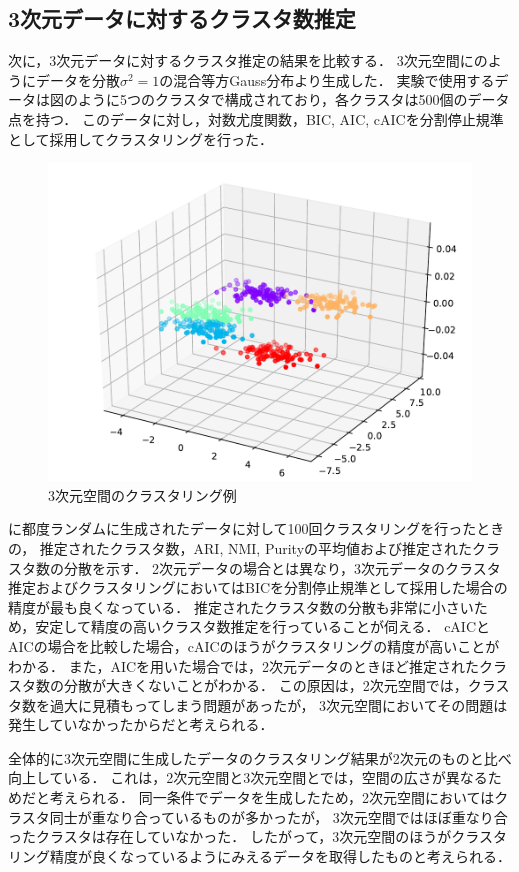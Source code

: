 \subsection{3次元データに対するクラスタ数推定}

次に，3次元データに対するクラスタ推定の結果を比較する．
3次元空間にのようにデータを分散$\sigma^2=1$の混合等方Gauss分布より生成した．
実験で使用するデータは図のように5つのクラスタで構成されており，各クラスタは500個のデータ点を持つ．
このデータに対し，対数尤度関数，BIC, AIC, cAICを分割停止規準として採用してクラスタリングを行った．

\begin{figure}[htbp]
  \begin{center}
    \includegraphics[width=0.7\linewidth]{./img/BIC_3.pdf}
      \caption{3次元空間のクラスタリング例}
      \label{fig:3dim}
  \end{center}
\end{figure}

に都度ランダムに生成されたデータに対して100回クラスタリングを行ったときの，
推定されたクラスタ数，ARI, NMI, Purityの平均値および推定されたクラスタ数の分散を示す．
2次元データの場合とは異なり，3次元データのクラスタ推定およびクラスタリングにおいてはBICを分割停止規準として採用した場合の精度が最も良くなっている．
推定されたクラスタ数の分散も非常に小さいため，安定して精度の高いクラスタ数推定を行っていることが伺える．
cAICとAICの場合を比較した場合，cAICのほうがクラスタリングの精度が高いことがわかる．
また，AICを用いた場合では，2次元データのときほど推定されたクラスタ数の分散が大きくないことがわかる．
この原因は，2次元空間では，クラスタ数を過大に見積もってしまう問題があったが，
3次元空間においてその問題は発生していなかったからだと考えられる．

全体的に3次元空間に生成したデータのクラスタリング結果が2次元のものと比べ向上している．
これは，2次元空間と3次元空間とでは，空間の広さが異なるためだと考えられる．
同一条件でデータを生成したため，2次元空間においてはクラスタ同士が重なり合っているものが多かったが，
3次元空間ではほぼ重なり合ったクラスタは存在していなかった．
したがって，3次元空間のほうがクラスタリング精度が良くなっているようにみえるデータを取得したものと考えられる．

